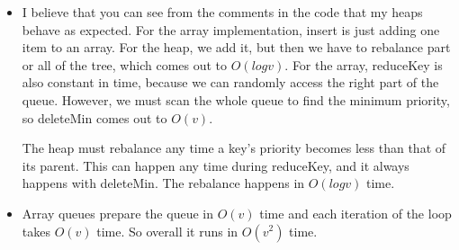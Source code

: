\documentclass{article}
\begin{document}
\begin{itemize}
\begin{lstlisting}
    }
} 

public class AQueue : PQueue
{
    Double[] array;
    int count;

    public AQueue(int size)
    {
        array = new Double[size];
        count = size;
    }

    // If I had actually needed this, it would be constant time
    public void insert(Double value)
    {
        // essentially do nothing
    }   

    // O(V).  Just filling up an array size V
    public void makeQueue()
    {
        for (int i = 0; i < count; i++)
        {
            array[i] = Double.MaxValue;
        }
    }

    // Constant time.  Array is random-access
    public void reduceKey(int key, Double newVal)
    {
        array[key] = newVal;
    }

    // O(v).  Must scan whole array, every time.
    public int deleteMin()
    {
        Double min = Double.MaxValue;
        int position = 0;

        for(int i = 0; i < array.Count(); i++)
        {
            if(array[i] != -1 && array[i] < min)
            {
                position = i;
                min = array[i];
            }
        }

        count--;
        // let's mark this cell in the array as "used" so that we don't duplicate it
        array[position] = -1;

        return position;
    }

    public bool notEmpty()
    {
        return count != 0;
    }
}
\end{lstlisting}
    \item I believe that you can see from the comments in the code that my heaps behave as expected. For the 
    array implementation, insert is just adding one item to an array.  For the heap, we add it, but then we have 
    to rebalance part or all of the tree, which comes out to $O(log v)$.  For the array, reduceKey is also
    constant in time, because we can randomly access the right part of the queue.  However, we must scan the
    whole queue to find the minimum priority, so deleteMin comes out to $O(v)$.

    The heap must rebalance any time a key's priority becomes less than that of its parent.  This can happen
    any time during reduceKey, and it always happens with deleteMin.  The rebalance happens in $O(log v)$ time.
    \item Array queues prepare the queue in $O(v)$ time and each iteration of the loop takes $O(v)$ time.  So 
    overall it runs in $O(v^2)$ time.


\end{itemize}
\end{document}
